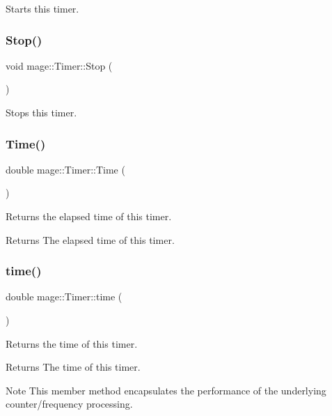 Starts this timer. \hypertarget{classmage_1_1_timer_abf234f1e2ee9e760f316bd49500d5a3a}{}\label{classmage_1_1_timer_abf234f1e2ee9e760f316bd49500d5a3a} 
\subsubsection{\texorpdfstring{Stop()}{Stop()}}
{\footnotesize\ttfamily void mage\+::\+Timer\+::\+Stop (\begin{DoxyParamCaption}{ }\end{DoxyParamCaption})}

Stops this timer. \hypertarget{classmage_1_1_timer_a5e4655ac296cc8971b54e5a76082f00f}{}\label{classmage_1_1_timer_a5e4655ac296cc8971b54e5a76082f00f} 
\subsubsection{\texorpdfstring{Time()}{Time()}}
{\footnotesize\ttfamily double mage\+::\+Timer\+::\+Time (\begin{DoxyParamCaption}{ }\end{DoxyParamCaption})}

Returns the elapsed time of this timer.

\begin{DoxyReturn}{Returns}
The elapsed time of this timer. 
\end{DoxyReturn}
\hypertarget{classmage_1_1_timer_a782882e9dbe9a2843b5203ba13309b23}{}\label{classmage_1_1_timer_a782882e9dbe9a2843b5203ba13309b23} 
\subsubsection{\texorpdfstring{time()}{time()}}
{\footnotesize\ttfamily double mage\+::\+Timer\+::time (\begin{DoxyParamCaption}{ }\end{DoxyParamCaption})\hspace{0.3cm}{\ttfamily [protected]}}

Returns the time of this timer.

\begin{DoxyReturn}{Returns}
The time of this timer. 
\end{DoxyReturn}
\begin{DoxyNote}{Note}
This member method encapsulates the performance of the underlying counter/frequency processing. 
\end{DoxyNote}


